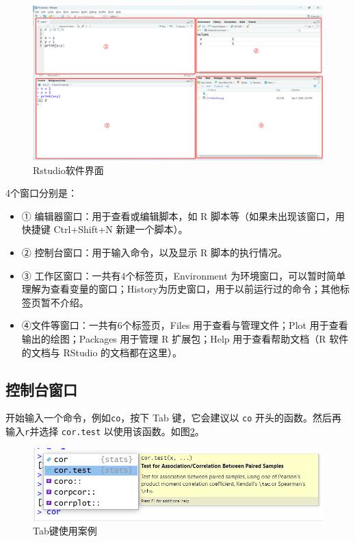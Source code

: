 \documentclass[
]{book}
\providecommand{\tightlist}{%
  \setlength{\itemsep}{0pt}\setlength{\parskip}{0pt}}
\begin{document}
\begin{figure}

{\centering \includegraphics[width=0.8\linewidth]{figs/02-Rstudio} 

}

\caption{Rstudio软件界面}\label{fig:Rstudio}
\end{figure}

4个窗口分别是：

\begin{itemize}
\tightlist
\item
  ① 编辑器窗口：用于查看或编辑脚本，如 R 脚本等（如果未出现该窗口，用快捷键 Ctrl+Shift+N 新建一个脚本）。
\item
  ② 控制台窗口：用于输入命令，以及显示 R 脚本的执行情况。
\item
  ③ 工作区窗口：一共有4个标签页，Environment 为环境窗口，可以暂时简单理解为查看变量的窗口；History为历史窗口，用于以前运行过的命令；其他标签页暂不介绍。
\item
  ④文件等窗口：一共有6个标签页，Files 用于查看与管理文件；Plot 用于查看输出的绘图；Packages 用于管理 R 扩展包；Help 用于查看帮助文档（R 软件的文档与 RStudio 的文档都在这里）。
\end{itemize}

\subsection{控制台窗口}\label{ux63a7ux5236ux53f0ux7a97ux53e3}

开始输入一个命令，例如\texttt{co}，按下 Tab 键，它会建议以 \texttt{co} 开头的函数。然后再输入\texttt{r}并选择 \texttt{cor.test} 以使用该函数。如图\ref{fig:cortest}。

\begin{figure}

{\centering \includegraphics[width=0.8\linewidth]{figs/03-Cor.test} 

}

\caption{Tab键使用案例}\label{fig:cortest}
\end{figure}
\end{document}
